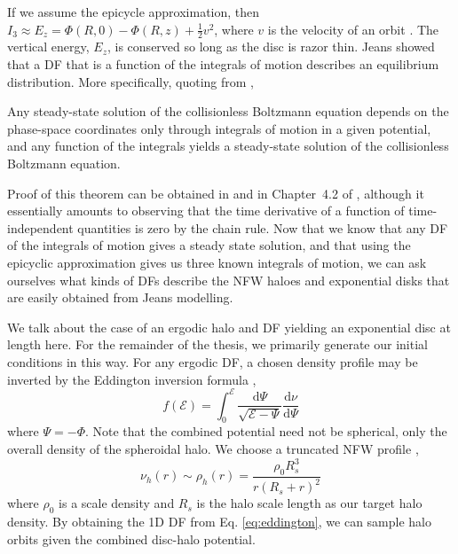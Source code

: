If we assume the epicycle approximation, then $I_3 \approx E_z = \Phi(R,0) - \Phi(R,z) + \frac{1}{2} v^2$, where $v$ is the velocity of an orbit \citep{kd95galactics}. The vertical energy, $E_z$, is conserved so long as the disc is razor thin. Jeans showed that a DF that is a function of the integrals of motion describes an equilibrium distribution. More specifically, quoting from \citet{BT},
\begin{theorem}
Any steady-state solution of the collisionless Boltzmann equation depends on the phase-space coordinates only through integrals of motion in a given potential, and any function of the integrals yields a steady-state solution of the collisionless Boltzmann equation.
\end{theorem}
Proof of this theorem can be obtained in \citet{jeans_1915} and in Chapter~4.2 of \citet{BT}, although it essentially amounts to observing that the time derivative of a function of time-independent quantities is zero by the chain rule. Now that we know that any DF of the integrals of motion gives a steady state solution, and that using the epicyclic approximation gives us three known integrals of motion, we can ask ourselves what kinds of DFs describe the NFW haloes and exponential disks that are easily obtained from Jeans modelling.

We talk about the case of an ergodic halo and DF yielding an exponential disc at length here. For the remainder of the thesis, we primarily generate our initial conditions in this way. For any ergodic DF, a chosen density profile may be inverted by the Eddington inversion formula \citep{BT},
\begin{equation}
f(\mathcal{E}) = \int_0^{\mathcal{E}} \frac{\text{d} \Psi}{\sqrt{\mathcal{E} - \Psi}} \frac{\text{d} \nu}{\text{d} \Psi} \label{eq:eddington}
\end{equation}
where $\Psi = - \Phi$. Note that the combined potential need not be spherical, only the overall density of the spheroidal halo. We choose a truncated NFW profile \citep{nfw},
\begin{equation}
\nu_h(r) \sim \rho_{h}(r) = \frac{\rho_0 R_s^3}{r (R_s + r)^2}
\end{equation}
where $\rho_0$ is a scale density and $R_s$ is the halo scale length as our target halo density. By obtaining the 1D DF from Eq. \eqref{eq:eddington}, we can sample halo orbits given the combined disc-halo potential.

